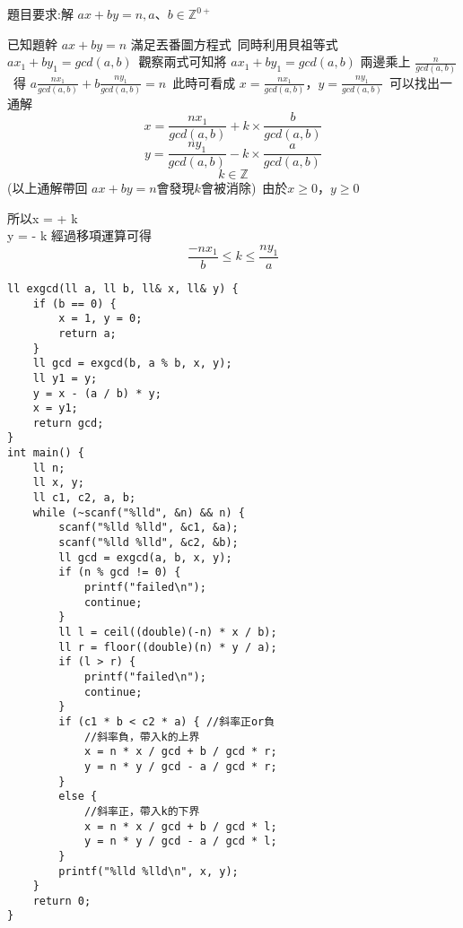 題目要求:解 $ax+by=n, a、b \in \mathbb{Z}^{0+}$

已知題幹 $ax+by=n$ 滿足丟番圖方程式\
同時利用貝祖等式 $ax_1 + by_1 = gcd(a, b)$\
觀察兩式可知將 $ax_1 + by_1 = gcd(a, b)$ 兩邊乘上 $\frac{n}{gcd(a, b)}$\
得 $a\frac{nx_1}{gcd(a, b)} + b\frac{ny_1}{gcd(a, b)} = n$\
此時可看成 $x = \frac{nx_1}{gcd(a, b)}$，$y = \frac{ny_1}{gcd(a, b)}$\
可以找出一通解
$$x =  + k \times {}$$
$$y =  - k \times {}$$
$$k \in \mathbb{Z}$$
(以上通解帶回 $ax + by = n$會發現$k$會被消除)\
$由於x \geq 0，y \geq 0$

所以x = \frac{nx_1}{gcd(a, b)} + k \times \frac{b}{gcd(a, b)}\\
y = \frac{ny_1}{gcd(a, b)} - k \times \frac{a}{gcd(a, b)}
經過移項運算可得
$$\frac{-nx_1}{b} \leq k \leq \frac{ny_1}{a}$$

\begin{lstlisting}
ll exgcd(ll a, ll b, ll& x, ll& y) {
    if (b == 0) {
        x = 1, y = 0;
        return a;
    }
    ll gcd = exgcd(b, a % b, x, y);
    ll y1 = y;
    y = x - (a / b) * y;
    x = y1;
    return gcd;
}
int main() {
    ll n;
    ll x, y;
    ll c1, c2, a, b;
    while (~scanf("%lld", &n) && n) {
        scanf("%lld %lld", &c1, &a);
        scanf("%lld %lld", &c2, &b);
        ll gcd = exgcd(a, b, x, y);
        if (n % gcd != 0) {
            printf("failed\n");
            continue;
        }
        ll l = ceil((double)(-n) * x / b);
        ll r = floor((double)(n) * y / a);
        if (l > r) {
            printf("failed\n");
            continue;
        }
        if (c1 * b < c2 * a) { //斜率正or負
            //斜率負，帶入k的上界
            x = n * x / gcd + b / gcd * r;
            y = n * y / gcd - a / gcd * r;
        }
        else {
            //斜率正，帶入k的下界
            x = n * x / gcd + b / gcd * l;
            y = n * y / gcd - a / gcd * l;
        }
        printf("%lld %lld\n", x, y);
    }
    return 0;
}
\end{lstlisting}